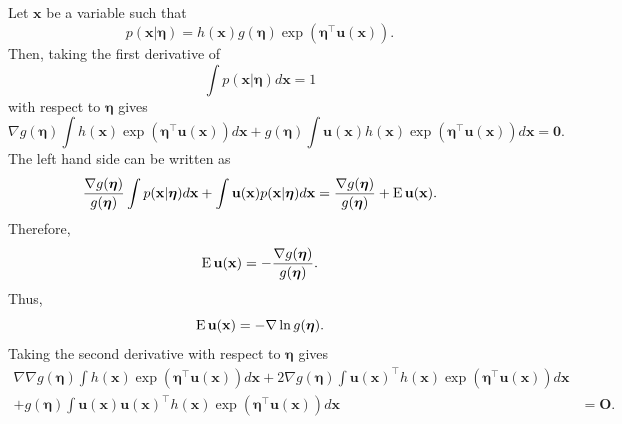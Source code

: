 \subsection{}
\label{2.58}
Let $\mathbf{x}$ be a variable such that
%
\begin{equation}
p(\mathbf{x} | \bm{\eta})
=
h(\mathbf{x})
g(\bm{\eta})
\exp
\left(
	\bm{\eta} ^ \intercal
	\mathbf{u} (\mathbf{x})
\right).
\end{equation}
%
Then, taking the first derivative of
%
\begin{equation}
\int
p(\mathbf{x} | \bm{\eta})
d\mathbf{x}
=
1
\end{equation}
%
with respect to $\bm{\eta}$ gives
%
\begin{equation}
\nabla g(\bm{\eta})
\int
h(\mathbf{x})
\exp
\left(
	\bm{\eta} ^ \intercal
	\mathbf{u} (\mathbf{x})
\right)
d\mathbf{x}
+
g(\bm{\eta})
\int
\mathbf{u} (\mathbf{x})
h(\mathbf{x})
\exp
\left(
	\bm{\eta} ^ \intercal
	\mathbf{u} (\mathbf{x})
\right)
d\mathbf{x}
=
\mathbf{0}. 
\end{equation}
%
The left hand side can be written as
%
\begin{equation}
\frac{\nabla g(\bm{\eta})}{g(\bm{\eta})}
\int
p(\mathbf{x} | \bm{\eta})
d\mathbf{x}
+
\int
\mathbf{u}(\mathbf{x})
p(\mathbf{x} | \bm{\eta})
d\mathbf{x}
=
\frac{\nabla g(\bm{\eta})}{g(\bm{\eta})}
+
\operatorname{E} \mathbf{u} (\mathbf{x}).
\end{equation}
%
Therefore,
%
\begin{equation}
\operatorname{E} \mathbf{u} (\mathbf{x})
=
-
\frac{\nabla g(\bm{\eta})}{g(\bm{\eta})}.
\end{equation}
%
Thus,
%
\begin{equation}
\operatorname{E} \mathbf{u} (\mathbf{x})
=
-
\nabla \ln g(\bm{\eta}).
\end{equation}
%
Taking the second derivative with respect to $\bm{\eta}$ gives
%
\begin{equation}
\begin{aligned}
\nabla 
\nabla 
g(\bm{\eta})
\int
h(\mathbf{x})
\exp
\left(
	\bm{\eta} ^ \intercal
	\mathbf{u} (\mathbf{x})
\right)
d\mathbf{x}
+
2 
\nabla 
g(\bm{\eta})
\int
\mathbf{u} (\mathbf{x}) ^ \intercal
h(\mathbf{x})
\exp
\left(
	\bm{\eta} ^ \intercal
	\mathbf{u} (\mathbf{x})
\right)
d\mathbf{x} \\
+
g(\bm{\eta})
\int
\mathbf{u} (\mathbf{x})
\mathbf{u} (\mathbf{x}) ^ \intercal
h(\mathbf{x})
\exp
\left(
	\bm{\eta} ^ \intercal
	\mathbf{u} (\mathbf{x})
\right)
d\mathbf{x}
&=
\mathbf{O}.
\end{aligned}
\end{equation}
